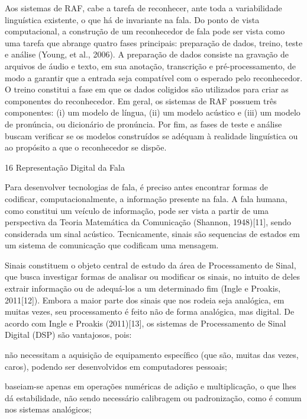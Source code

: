 Aos sistemas de RAF, cabe a tarefa de reconhecer, ante toda a
variabilidade lingu\'istica existente, o que h\'a de invariante na fala. Do
ponto de vista computacional, a constru\c{c}\~ao de um reconhecedor de fala
pode ser vista como uma tarefa que abrange quatro fases principais:
prepara\c{c}\~ao de dados, treino, teste e an\'alise (Young, et al., 2006). A
prepara\c{c}\~ao de dados consiste na grava\c{c}\~ao de arquivos de \'audio e texto,
em sua anota\c{c}\~ao, transcri\c{c}\~ao e pr\'e-processamento, de modo a garantir que
a entrada seja compat\'ivel com o esperado pelo reconhecedor. O treino
constitui a fase em que os dados coligidos s\~ao utilizados para criar as
componentes do reconhecedor. Em geral, os sistemas de RAF possuem tr\^es
componentes: (i) um modelo de l\'ingua, (ii) um modelo ac\'ustico e (iii) um
modelo de pron\'uncia, ou dicion\'ario de pron\'uncia. Por fim, as fases de
teste e an\'alise buscam verificar se os modelos constru\'idos se ad\'equam à
realidade lingu\'istica ou ao prop\'osito a que o reconhecedor se disp\~oe.

16 Representa\c{c}\~ao Digital da Fala

Para desenvolver tecnologias de fala, \'e preciso antes encontrar formas
de codificar, computacionalmente, a informa\c{c}\~ao presente na fala. A fala
humana, como constitui um ve\'iculo de informa\c{c}\~ao, pode ser vista a partir
de uma perspectiva da Teoria Matem\'atica da Comunica\c{c}\~ao (Shannon,
1948){[}11{]}, sendo considerada um sinal ac\'ustico. Tecnicamente, sinais
s\~ao sequencias de estados em um sistema de comunica\c{c}\~ao que codificam uma
mensagem.

Sinais constituem o objeto central de estudo da \'area de Processamento de
Sinal, que busca investigar formas de analisar ou modificar os sinais,
no intuito de deles extrair informa\c{c}\~ao ou de adequ\'a-los a um determinado
fim (Ingle e Proakis, 2011{[}12{]}). Embora a maior parte dos sinais que
nos rodeia seja anal\'ogica, em muitas vezes, seu processamento \'e feito
n\~ao de forma anal\'ogica, mas digital. De acordo com Ingle e Proakis
(2011){[}13{]}, os sistemas de Processamento de Sinal Digital (DSP) s\~ao
vantajosos, pois:

n\~ao necessitam a aquisi\c{c}\~ao de equipamento espec\'ifico (que s\~ao, muitas
das vezes, caros), podendo ser desenvolvidos em computadores pessoais;

baseiam-se apenas em opera\c{c}\~oes num\'ericas de adi\c{c}\~ao e multiplica\c{c}\~ao, o
que lhes d\'a estabilidade, n\~ao sendo necess\'ario calibragem ou
padroniza\c{c}\~ao, como \'e comum nos sistemas anal\'ogicos;


